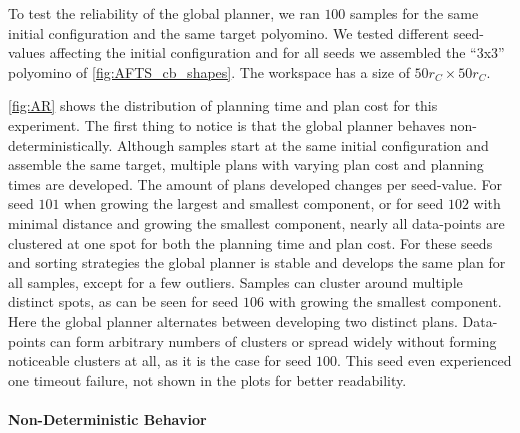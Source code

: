 To test the reliability of the global planner, we ran $100$ samples for the same initial configuration and the same target polyomino.
We tested different seed-values affecting the initial configuration and for all seeds we assembled the ``3x3'' polyomino of \autoref{fig:AFTS_cb_shapes}.
The workspace has a size of $50 r_C \times 50 r_C$.

\autoref{fig:AR} shows the distribution of planning time and plan cost for this experiment.
The first thing to notice is that the global planner behaves non-deterministically.
Although samples start at the same initial configuration and assemble the same target, multiple plans with varying plan cost and planning times are developed.
The amount of plans developed changes per seed-value.
For seed $101$ when growing the largest and smallest component, or for seed $102$ with minimal distance and growing the smallest component, nearly all data-points are clustered at one spot for both the planning time and plan cost.
For these seeds and sorting strategies the global planner is stable and develops the same plan for all samples, except for a few outliers.
Samples can cluster around multiple distinct spots, as can be seen for seed $106$ with growing the smallest component.
Here the global planner alternates between developing two distinct plans.
Data-points can form arbitrary numbers of clusters or spread widely without forming noticeable clusters at all, as it is the case for seed $100$.
This seed even experienced one timeout failure, not shown in the plots for better readability. 

\paragraph{Non-Deterministic Behavior}

